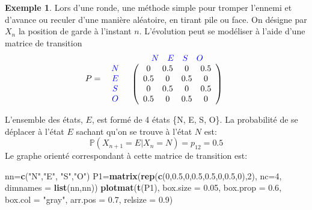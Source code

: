 \documentclass[
]{book}
\newenvironment{Shaded}{\begin{snugshade}}{\end{snugshade}}
\newcommand{\DataTypeTok}[1]{\textcolor[rgb]{0.13,0.29,0.53}{#1}}
\newcommand{\DecValTok}[1]{\textcolor[rgb]{0.00,0.00,0.81}{#1}}
\newcommand{\FloatTok}[1]{\textcolor[rgb]{0.00,0.00,0.81}{#1}}
\newcommand{\KeywordTok}[1]{\textcolor[rgb]{0.13,0.29,0.53}{\textbf{#1}}}
\newcommand{\NormalTok}[1]{#1}
\newcommand{\StringTok}[1]{\textcolor[rgb]{0.31,0.60,0.02}{#1}}
\theoremstyle{definition}
\theoremstyle{definition}
\newtheorem{example}{Exemple}[chapter]
\theoremstyle{definition}
\theoremstyle{remark}
\begin{document}
\begin{example}
\protect\hypertarget{exm:unnamed-chunk-42}{}{\label{exm:unnamed-chunk-42} }Lors d'une ronde, une méthode simple pour tromper l'ennemi et d'avance ou reculer d'une manière aléatoire, en tirant pile ou face. On désigne par \(X_n\) la position de garde à l'instant \(n\). L'évolution peut se modéliser à l'aide d'une matrice de transition
\[
 P=\begin{array}{c c} &
\begin{array}{c c c c} \color{blue}{N} & \color{blue}{E} & \color{blue}{S} & \color{blue}{O} \\
\end{array}
\\
\begin{array}{c c c c}
\color{blue}{N} \\
\color{blue}{E}\\
\color{blue}{S} \\
\color{blue}{O}
\end{array}
&
\left(
\begin{array}{c c c c}
0 & 0.5 & 0 & 0.5 \\
0.5 & 0 & 0.5 & 0 \\
0 & 0.5 & 0 & 0.5 \\
0.5 & 0 & 0.5 & 0
\end{array}
\right)
\end{array}\]
\end{example}

L'ensemble des états, \(E\), est formé de 4 états \{N, E, S, O\}. La probabilité de se déplacer à l'état \(E\) sachant qu'on se trouve à l'état \(N\) est:
\[
\mathbb{P}(X_{n+1}=E|X_n=N)=p_{12}=0.5
\]
Le graphe orienté correspondant à cette matrice de transition est:

\begin{Shaded}
\begin{Highlighting}[]
\NormalTok{nn=}\KeywordTok{c}\NormalTok{(}\StringTok{"N"}\NormalTok{,}\StringTok{"E"}\NormalTok{, }\StringTok{"S"}\NormalTok{,}\StringTok{"O"}\NormalTok{)}
\NormalTok{P1=}\KeywordTok{matrix}\NormalTok{(}\KeywordTok{rep}\NormalTok{(}\KeywordTok{c}\NormalTok{(}\DecValTok{0}\NormalTok{,}\FloatTok{0.5}\NormalTok{,}\DecValTok{0}\NormalTok{,}\FloatTok{0.5}\NormalTok{,}\FloatTok{0.5}\NormalTok{,}\DecValTok{0}\NormalTok{,}\FloatTok{0.5}\NormalTok{,}\DecValTok{0}\NormalTok{),}\DecValTok{2}\NormalTok{), }\DataTypeTok{nc=}\DecValTok{4}\NormalTok{,}
          \DataTypeTok{dimnames =} \KeywordTok{list}\NormalTok{(nn,nn))}
\KeywordTok{plotmat}\NormalTok{(}\KeywordTok{t}\NormalTok{(P1), }\DataTypeTok{box.size =} \FloatTok{0.05}\NormalTok{, }\DataTypeTok{box.prop =} \FloatTok{0.6}\NormalTok{, }\DataTypeTok{box.col =} \StringTok{"gray"}\NormalTok{, }
          \DataTypeTok{arr.pos =} \FloatTok{0.7}\NormalTok{, }\DataTypeTok{relsize =} \FloatTok{0.9}\NormalTok{)}
\end{Highlighting}
\end{Shaded}
\end{document}
